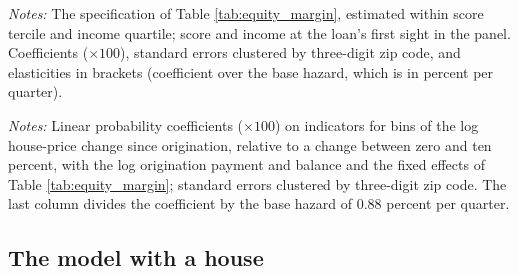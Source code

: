 \begin{table}[H]
\centering
\caption{The equity margin and the payment margin by score and income}
\label{tab:equity_groups}
\small
\resizebox{\textwidth}{!}{}
\vspace{0.5em}
\begin{minipage}{0.92\textwidth}
\noindent \small \textit{Notes:} The specification of Table \ref{tab:equity_margin}, estimated within score tercile and income quartile; score and income at the loan's first sight in the panel. Coefficients ($\times 100$), standard errors clustered by three-digit zip code, and elasticities in brackets (coefficient over the base hazard, which is in percent per quarter).
\end{minipage}
\end{table}

\begin{table}[H]
\centering
\caption{The hazard by bin of the house-price change since origination}
\label{tab:equity_bins}
\small

\vspace{0.5em}
\begin{minipage}{0.92\textwidth}
\noindent \small \textit{Notes:} Linear probability coefficients ($\times 100$) on indicators for bins of the log house-price change since origination, relative to a change between zero and ten percent, with the log origination payment and balance and the fixed effects of Table \ref{tab:equity_margin}; standard errors clustered by three-digit zip code. The last column divides the coefficient by the base hazard of $0.88$ percent per quarter.
\end{minipage}
\end{table}

\subsection{The model with a house}

